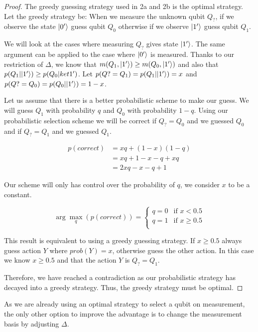 \begin{proof} The greedy guessing strategy used in 2a and 2b is the optimal strategy.
Let the greedy strategy be: When we measure the unknown qubit $Q_?$, if we observe the state $\lvert0'\rangle$ guess qubit $Q_0$ otherwise if we observe $\lvert1'\rangle$ guess qubit $Q_1$.

We will look at the cases where measuring $Q_?$ gives state $\lvert1'\rangle$.
The same argument can be applied to the case where $\lvert0'\rangle$ is measured.
Thanks to our restriction of $\Delta$, we know that $m(Q_1, \lvert1'\rangle)\geq m(Q_0, \lvert1'\rangle)$ and also that $p(Q_1|\lvert1'\rangle) \geq p(Q_0|ket{1'})$.
Let $p(Q? = Q_1) = p(Q_1|\lvert1'\rangle) = x$ and $p(Q? = Q_0) = p(Q_0|\lvert1'\rangle) = 1-x$.

Let us assume that there is a better probabilistic scheme to make our guess.
We will guess $Q_1$ with probability $q$ and $Q_0$ with probability $1-q$.
Using our probabilistic selection scheme we will be correct if $Q_?=Q_0$ and we guessed $Q_0$ and if $Q_?=Q_1$ and we guessed $Q_1$.

\begin{align*}
    p(correct) &= xq + (1-x)(1-q)\\
    &= xq + 1-x-q+xq\\
    &= 2xq-x-q+1
\end{align*}

Our scheme will only has control over the probability of $q$, we consider $x$ to be a constant.

\[
    \arg \max_q(p(correct)) = \begin{cases}
        q = 0 & \text{if } x<0.5\\
        q = 1 & \text{if } x\geq 0.5\\
    \end{cases}
\]

This result is equivalent to using a greedy guessing strategy.
If $x\geq 0.5$ always guess action $Y$ where $prob(Y)=x$, otherwise guess the other action.
In this case we know $x\geq 0.5$ and that the action $Y$ is $Q_? = Q_1$.

Therefore, we have reached a contradiction as our probabilistic strategy has decayed into a greedy strategy.
Thus, the greedy strategy must be optimal. 
\end{proof}

As we are already using an optimal strategy to select a qubit on measurement, the only other option to improve the advantage is to change the measurement basis by adjusting $\Delta$.

